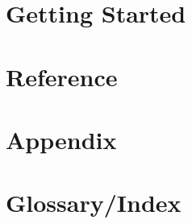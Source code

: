 \documentclass[wordperfect,binder]{initech-manual}
\begin{document}
\FrontMatterFolios
\MakeTitlePage

\tableofcontents
\cleardoublepage
\setcounter{page}{1}\gdef{}
\DividerLeaf
\chapter{Getting Started}



\DividerLeaf
\chapter{Reference}


















\DividerLeaf
\chapter{Appendix}

\DividerLeaf
\chapter{Glossary/Index}

\printindex
\FinishBook[3]
\end{document}
